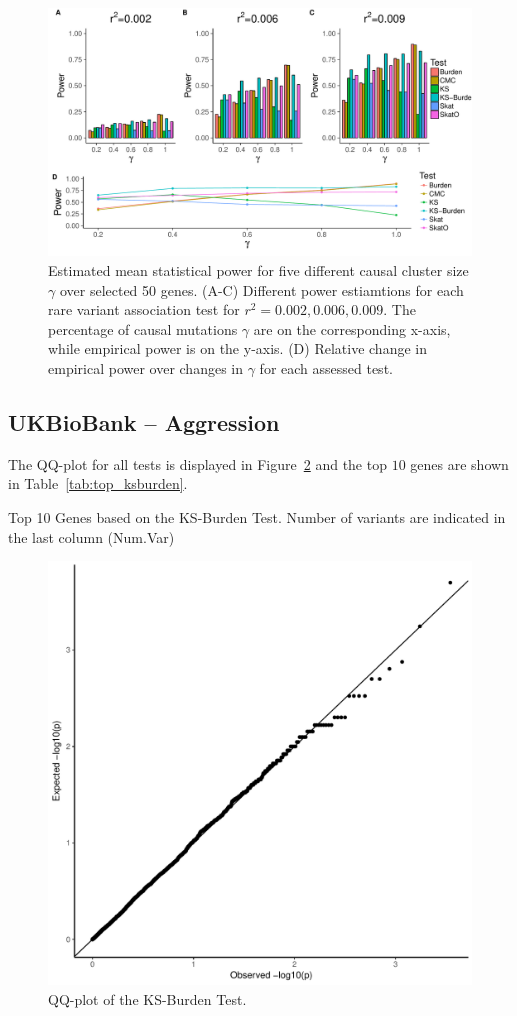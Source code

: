 \begin{figure}[ht!]
  \centering
  \includegraphics[width=0.8\linewidth]{ksburden/figures/combined_power_analysis.pdf}
  \caption{Estimated mean statistical power for five different causal cluster size $\gamma$ over selected 50 genes.
    (A-C) Different power estiamtions for each rare variant association test for $r^2=0.002, 0.006, 0.009$.
    The percentage of causal mutations $\gamma$ are on the corresponding x-axis, while empirical power is on the y-axis.
    (D) Relative change in empirical power over changes in $\gamma$ for each assessed test.\label{fig:simulatedGeneRealData}}
\end{figure}


\subsection{UKBioBank -- Aggression}
\label{sub:ukbiobank_aggression}

The QQ-plot for all tests is displayed in Figure~\ref{fig:qqplot_ksburden} and the top $10$ genes are shown in Table~\ref{tab:top_ksburden}.

\begin{table}[htpb]
  \centering
  
  \caption{Top 10 Genes based on the KS-Burden Test.
  Number of variants are indicated in the last column (Num.Var)}\label{tab:top_ksburden}
\end{table}

\begin{figure}[htpb]
  \centering
  \includegraphics[width=0.8\linewidth]{ksburden/figures/qqplot_aggression.pdf}
  \caption{QQ-plot of the KS-Burden Test.}\label{fig:qqplot_ksburden}
\end{figure}
